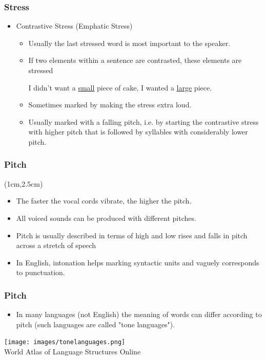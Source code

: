 \documentclass[12pt, table]{beamer}
\begin{document}
\begin{frame}
\frametitle{Stress}
\begin{itemize}
\item Contrastive Stress (Emphatic Stress)
\begin{itemize}
\item Usually the last stressed word is most important to the speaker.
\item If two elements within a sentence are contrasted, these elements are stressed
\begin{exe}
\ex I didn't want a \uline{small} piece of cake, I wanted a \uline{large} piece.
\end{exe}
\item Sometimes marked by making the stress extra loud.
\item Usually marked with a falling pitch, i.e. by starting the contrastive stress with higher pitch that is followed by syllables with considerably lower pitch.
\end{itemize}
\end{itemize}
\end{frame}

\begin{frame}
\frametitle{Pitch}
\begin{textblock*}{10.5cm}(1cm,2.5cm)
\begin{itemize}
\item The faster the vocal cords vibrate, the higher the pitch.
\item All voiced sounds can be produced with different pitches.
\item Pitch is usually described in terms of high and low
rises and falls in pitch across a stretch of speech
\item In English, intonation helps marking syntactic units and vaguely corresponds to punctuation.
\end{itemize}
\end{textblock*}
\end{frame}

\begin{frame}
\frametitle{Pitch}
\begin{itemize}
\item In many languages (not English) the meaning of words can differ according to pitch (such languages are called "tone languages").
\end{itemize}
\texttt{[image: images/tonelanguages.png]}\\
\hfill \footnotesize{World Atlas of Language Structures Online}\\
\end{frame}
\end{document}
